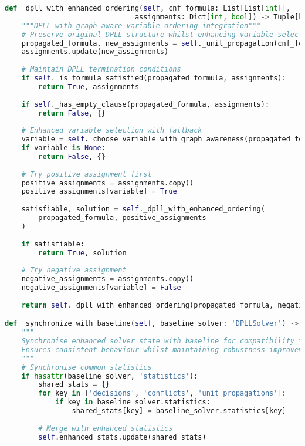 \begin{lstlisting}[language=Python, caption=Integration Challenge Resolution Implementation]
def _dpll_with_enhanced_ordering(self, cnf_formula: List[List[int]], 
                               assignments: Dict[int, bool]) -> Tuple[bool, Dict[int, bool]]:
    """DPLL with graph-aware variable ordering integration"""
    # Preserve original DPLL structure whilst enhancing variable selection
    propagated_formula, new_assignments = self._unit_propagation(cnf_formula, assignments.copy())
    assignments.update(new_assignments)
    
    # Maintain DPLL termination conditions
    if self._is_formula_satisfied(propagated_formula, assignments):
        return True, assignments
    
    if self._has_empty_clause(propagated_formula, assignments):
        return False, {}
    
    # Enhanced variable selection with fallback
    variable = self._choose_variable_with_graph_awareness(propagated_formula, assignments)
    if variable is None:
        return False, {}
    
    # Try positive assignment first
    positive_assignments = assignments.copy()
    positive_assignments[variable] = True
    
    satisfiable, solution = self._dpll_with_enhanced_ordering(
        propagated_formula, positive_assignments
    )
    
    if satisfiable:
        return True, solution
    
    # Try negative assignment
    negative_assignments = assignments.copy()
    negative_assignments[variable] = False
    
    return self._dpll_with_enhanced_ordering(propagated_formula, negative_assignments)

def _synchronize_with_baseline(self, baseline_solver: 'DPLLSolver') -> None:
    """
    Synchronise enhanced solver state with baseline for compatibility testing.
    Ensures consistent behaviour whilst maintaining robustness improvements.
    """
    # Synchronise common statistics
    if hasattr(baseline_solver, 'statistics'):
        shared_stats = {}
        for key in ['decisions', 'conflicts', 'unit_propagations']:
            if key in baseline_solver.statistics:
                shared_stats[key] = baseline_solver.statistics[key]
        
        # Merge with enhanced statistics
        self.enhanced_stats.update(shared_stats)
    

\end{lstlisting}

